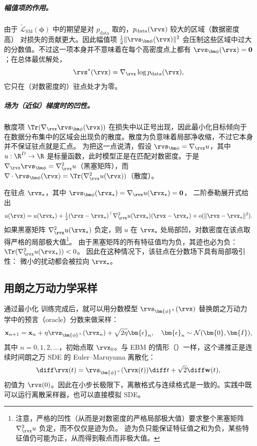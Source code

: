 \subparagraph{幅值项的作用。}
由于 $\widetilde{\mathcal{L}}_{\mathrm{SM}}(\bm\phi)$ 中的期望是对
$p_{\mathrm{data}}$ 取的，$p_{\mathrm{data}}(\rvx)$ 较大的区域（数据密度高）
对损失的贡献更大。因此幅值项
$\tfrac12\|\rvs_{\bm\phi}(\rvx)\|^2$ 会压制这些区域中过大的分数值。不过这一项本身并不意味着在每个高密度点上都有 $\rvs_{\bm\phi}(\rvx)=\mathbf{0}$；在总体最优解处，
\[
\rvs^*(\rvx)=\nabla_{\rvx}\log p_{\mathrm{data}}(\rvx),
\]
它只在（对数密度的）驻点处才为零。

\subparagraph{场为（近似）梯度时的凹性。}
散度项 $\Tr(\nabla_{\rvx} \rvs_{\bm\phi}(\rvx))$ 在损失中以正号出现，因此最小化目标倾向于在数据分布集中的区域会出现负的散度。散度为负意味着局部净收缩，不过它本身并不保证驻点就是汇点。
为把这一点说清，假设
$\rvs_{\bm\phi}=\nabla_{\rvx}u$，其中 $u:\R^D\to\R$ 是标量函数，此时模型正是在匹配对数密度。于是 $\nabla_{\rvx}\rvs_{\bm\phi}=\nabla_{\rvx}^2 u$（黑塞矩阵），而
$\nabla \cdot \rvs_{\bm\phi}(\rvx)=\Tr(\nabla_{\rvx}^2 u(\rvx))$（散度）。

在驻点 $\rvx_\star$，其中 $\rvs_{\bm\phi}(\rvx_\star)=\nabla_{\rvx}u(\rvx_\star)=\mathbf{0}$，
二阶泰勒展开式给出
\[
u(\rvx)
= u(\rvx_\star)
+ \tfrac12(\rvx-\rvx_\star)^\top \nabla_{\rvx}^2 u(\rvx_\star)(\rvx-\rvx_\star)
+ o(\|\rvx-\rvx_\star\|^2).
\]
如果黑塞矩阵 $\nabla_{\rvx}^2 u(\rvx_\star)$ 负定，则 $u$ 在
$\rvx_\star$ 处局部凹，对数密度在该点取得严格的局部极大值\footnote{ 注意，严格的凹性（从而是对数密度的严格局部极大值）要求整个黑塞矩阵
$\nabla_{\rvx}^2 u$ 负定，而不仅仅是迹为负。
迹为负只能保证特征值之和为负，某些特征值仍可能为正，从而得到鞍点而非极大值。
}。
由于黑塞矩阵的所有特征值均为负，其迹也必为负：
$\Tr(\nabla_{\rvx}^2 u(\rvx_\star))<0$。
因此在这种情况下，该驻点在分数场下具有局部吸引性：
微小的扰动都会被拉向 $\rvx_\star$。

\subsection{用朗之万动力学采样}
通过最小化  训练完成后，就可以用分数模型 $\rvs_{\bm{\phi}^\times}(\rvx)$ 替换朗之万动力学中的预言（oracle）分数来做采样：
\begin{align}\label{eq:score-langevin-emp}
    \mathbf{x}_{n+1} = \mathbf{x}_n + \eta   \rvs_{\bm{\phi}^\times}(\rvx_n) + \sqrt{2\eta}    \bm{\epsilon}_n, \quad \bm{\epsilon}_n \sim \mathcal{N}(\bm{0}, \bm{I}),
\end{align}
其中 $n=0,1,2,\dots$，初始点取 $\rvx_0$。与 EBM 的情形（）一样，这个递推正是连续时间朗之万 SDE 的 Euler--Maruyama 离散化：
\begin{align*}
    \diff \rvx(t) = \rvs_{\bm{\phi}^\times}(\rvx(t)) \diff t + \sqrt{2} \diff \mathbf{w}(t),
\end{align*}
初值为 $\rvx(0)$。因此在小步长极限下，离散格式与连续格式是一致的。实践中既可以运行离散采样器，也可以直接模拟 SDE。


